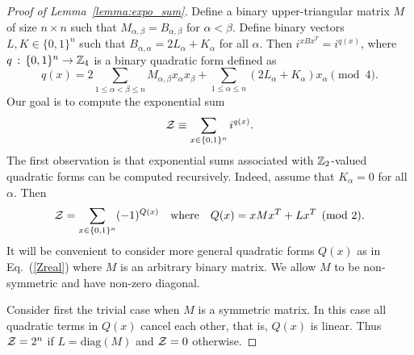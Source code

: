 \begin{proof}[Proof of Lemma~\ref{lemma:expo_sum}]
Define a binary upper-triangular matrix $M$ of size $n\times n$
such that 
$M_{\alpha,\beta}=B_{\alpha,\beta}$  for $\alpha<\beta$.
Define binary vectors $L,K\in \{0,1\}^n$ such that 
$B_{\alpha,\alpha}=2L_\alpha + K_\alpha$ for all $\alpha$.
Then  $i^{xBx^T}=i^{q(x)}$, where $q\, : \, \{0,1\}^n \to \mathbb{Z}_4$
is a binary quadratic form  defined as 
\begin{equation}
\label{q}
q(x)=2\sum_{1\le \alpha< \beta \le n} M_{\alpha,\beta} x_\alpha x_\beta  + \sum_{1\le \alpha\le n} (2L_\alpha + K_\alpha) x_\alpha
{\pmod 4}.
\end{equation}
Our goal is to compute the exponential sum
\begin{equation}
\label{Z}
{\cal Z } \equiv \sum_{x\in \{0,1\}^n} i^{q(x)}.
\end{equation}
The first observation is that exponential sums associated with $\mathbb{Z}_2$-valued quadratic forms
can be computed recursively.  Indeed, assume that $K_\alpha=0$ for all $\alpha$. 
Then 
\begin{equation}
\label{Zreal}
{\cal Z }=\sum_{x\in \{0,1\}^n}  (-1)^{Q(x)} \quad  \mbox{where} \quad Q(x)=xM x^T + L x^T   {\pmod 2}.
\end{equation}
It will be convenient to consider more general quadratic forms $Q(x)$ as in Eq.~(\ref{Zreal})
where $M$ is an arbitrary binary matrix. We allow $M$ to be  non-symmetric
and  have non-zero diagonal. 

Consider first the trivial case when $M$ is a symmetric matrix. 
In this case all quadratic terms in $Q(x)$ cancel each other, that is, $Q(x)$ is linear.
Thus  ${\cal Z }=2^n$ if $L=\mathrm{diag}(M)$ and ${\cal Z }=0$ otherwise.


\end{proof}
